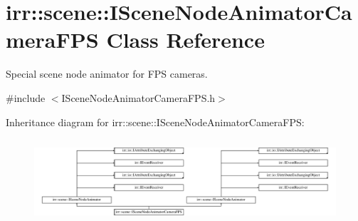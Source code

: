 \hypertarget{classirr_1_1scene_1_1ISceneNodeAnimatorCameraFPS}{}\section{irr\+:\+:scene\+:\+:I\+Scene\+Node\+Animator\+Camera\+F\+PS Class Reference}
\label{classirr_1_1scene_1_1ISceneNodeAnimatorCameraFPS}


Special scene node animator for F\+PS cameras.  




{\ttfamily \#include $<$I\+Scene\+Node\+Animator\+Camera\+F\+P\+S.\+h$>$}

Inheritance diagram for irr\+:\+:scene\+:\+:I\+Scene\+Node\+Animator\+Camera\+F\+PS\+:\begin{figure}[H]
\begin{center}
\leavevmode
\includegraphics[height=3.157895cm]{classirr_1_1scene_1_1ISceneNodeAnimatorCameraFPS}
\end{center}
\end{figure}
